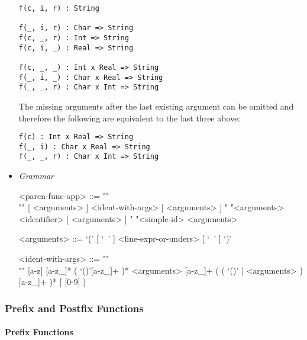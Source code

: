 \documentclass{article}
\begin{document}
\begin{itemize}
\begin{verbatim}
f(c, i, r) : String

f(_, i, r) : Char => String
f(c, _, r) : Int => String
f(c, i, _) : Real => String

f(c, _, _) : Int x Real => String
f(_, i, _) : Char x Real => String
f(_, _, r) : Char x Int => String
\end{verbatim}

The missing arguments after the last existing argument can be omitted and
therefore the following are equivalent to the last three above:

\begin{verbatim}
f(c) : Int x Real => String
f(_, i) : Char x Real => String
f(_, _, r) : Char x Int => String
\end{verbatim}

\item \textit{Grammar}
\begin{grammar}
<paren-func-app> ::= ""\\""
[ <arguments> ] <ident-with-args> [ <arguments> ]
\alt " "<arguments> <identifier> [ <arguments> ]
\alt " "<simple-id> <arguments>

<arguments> ::= `(' [ `\ ' ] <line-expr-or-unders> [ `\ ' ] `)'

<ident-with-args> ::= ""\\""
[a-z] [a-z_]* ( `()'[a-z_]+ )* <arguments>
[a-z_]+ ( ( `()' | <arguments> ) [a-z_]+ )* 
[ [0-9] ]
\end{grammar}

\end{itemize}

\newpage

\subsubsection{Prefix and Postfix Functions}
\label{subsubsec:prefixpostfix}
 
\paragraph{Prefix Functions}
\end{document}
